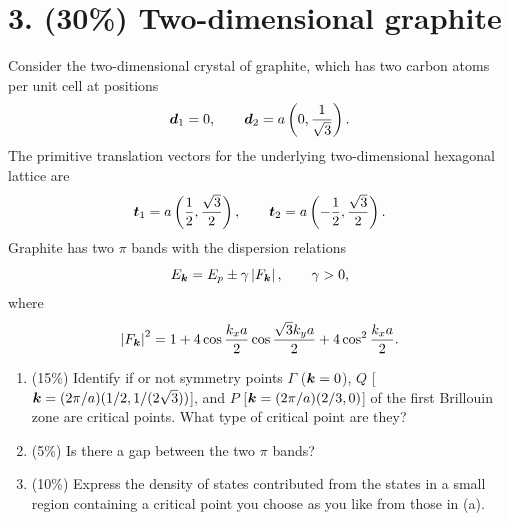 \section*{3. (30\%) Two-dimensional graphite}
Consider the two-dimensional crystal of graphite, which has two carbon atoms per unit cell at positions
\[
\boldsymbol{d}_1=0,\qquad \boldsymbol{d}_2=a\left(0,\frac1{\sqrt3}\right).
\]
The primitive translation vectors for the underlying two-dimensional hexagonal lattice are
\[
\boldsymbol{t}_1=a\left(\frac12,\frac{\sqrt3}{2}\right),\qquad
\boldsymbol{t}_2=a\left(-\frac12,\frac{\sqrt3}{2}\right).
\]
Graphite has two $\pi$ bands with the dispersion relations
\[
E_{\boldsymbol{k}}=E_p\pm\gamma\left|F_{\boldsymbol{k}}\right|,\qquad \gamma>0,
\]
where
\[
\left|F_{\boldsymbol{k}}\right|^{2}
=1+4\cos\frac{k_xa}{2}\cos\frac{\sqrt3 k_ya}{2}
+4\cos^2\frac{k_xa}{2}.
\]
\begin{enumerate}[label=(\alph*)]
\item (15\%) Identify if or not symmetry points $\Gamma$ ($\boldsymbol{k}=0$), $Q$ [$\boldsymbol{k}=(2\pi/a)(1/2,1/(2\sqrt3))$], and $P$ [$\boldsymbol{k}=(2\pi/a)(2/3,0)$] of the first Brillouin zone are critical points. What type of critical point are they?
\item (5\%) Is there a gap between the two $\pi$ bands?
\item (10\%) Express the density of states contributed from the states in a small region containing a critical point you choose as you like from those in (a).
\end{enumerate}
